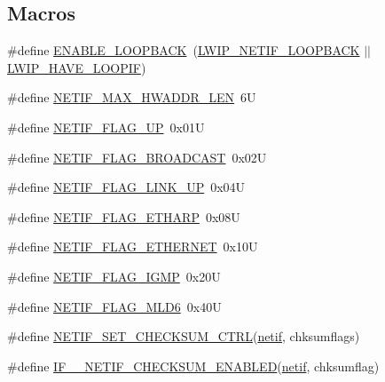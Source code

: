 \subsection*{Macros}
\begin{DoxyCompactItemize}
\item 
\#define \hyperlink{openmote-cc2538_2lwip_2src_2include_2lwip_2netif_8h_a53a4d9ad0bbe679841b5ff3f6906076c}{E\+N\+A\+B\+L\+E\+\_\+\+L\+O\+O\+P\+B\+A\+CK}~(\hyperlink{group__lwip__opts__loop_ga724a0ea765d5a47d026d529725f31c01}{L\+W\+I\+P\+\_\+\+N\+E\+T\+I\+F\+\_\+\+L\+O\+O\+P\+B\+A\+CK} $\vert$$\vert$ \hyperlink{group__lwip__opts__loop_gaa2b1f736373cd896e212644aa453fbaf}{L\+W\+I\+P\+\_\+\+H\+A\+V\+E\+\_\+\+L\+O\+O\+P\+IF})
\item 
\#define \hyperlink{openmote-cc2538_2lwip_2src_2include_2lwip_2netif_8h_ab887a8ec553de1be1d04cf2961c63c41}{N\+E\+T\+I\+F\+\_\+\+M\+A\+X\+\_\+\+H\+W\+A\+D\+D\+R\+\_\+\+L\+EN}~6U
\item 
\#define \hyperlink{group__netif__flags_gab47d7d130693dc155f480a5bf447725e}{N\+E\+T\+I\+F\+\_\+\+F\+L\+A\+G\+\_\+\+UP}~0x01U
\item 
\#define \hyperlink{group__netif__flags_gaef64fe15c82bc7b235366923e517104e}{N\+E\+T\+I\+F\+\_\+\+F\+L\+A\+G\+\_\+\+B\+R\+O\+A\+D\+C\+A\+ST}~0x02U
\item 
\#define \hyperlink{group__netif__flags_ga75f5a2b9276c93e3bd18a568459fd2d8}{N\+E\+T\+I\+F\+\_\+\+F\+L\+A\+G\+\_\+\+L\+I\+N\+K\+\_\+\+UP}~0x04U
\item 
\#define \hyperlink{group__netif__flags_ga92448dc510bc8d700c09e5c971ef0676}{N\+E\+T\+I\+F\+\_\+\+F\+L\+A\+G\+\_\+\+E\+T\+H\+A\+RP}~0x08U
\item 
\#define \hyperlink{group__netif__flags_ga76ad9d0cf9f029df0ab2a998c64040dc}{N\+E\+T\+I\+F\+\_\+\+F\+L\+A\+G\+\_\+\+E\+T\+H\+E\+R\+N\+ET}~0x10U
\item 
\#define \hyperlink{group__netif__flags_gac9493b923d733c73f6006d9714826558}{N\+E\+T\+I\+F\+\_\+\+F\+L\+A\+G\+\_\+\+I\+G\+MP}~0x20U
\item 
\#define \hyperlink{group__netif__flags_gab14fbe1447d2fdbdf5abc87f51eb6508}{N\+E\+T\+I\+F\+\_\+\+F\+L\+A\+G\+\_\+\+M\+L\+D6}~0x40U
\item 
\#define \hyperlink{openmote-cc2538_2lwip_2src_2include_2lwip_2netif_8h_ac0aca2a2d3c7d7095939d818acf4dbd2}{N\+E\+T\+I\+F\+\_\+\+S\+E\+T\+\_\+\+C\+H\+E\+C\+K\+S\+U\+M\+\_\+\+C\+T\+RL}(\hyperlink{structnetif}{netif},  chksumflags)
\item 
\#define \hyperlink{openmote-cc2538_2lwip_2src_2include_2lwip_2netif_8h_ad968df1b35c2fae368e087966e3bc677}{I\+F\+\_\+\+\_\+\+N\+E\+T\+I\+F\+\_\+\+C\+H\+E\+C\+K\+S\+U\+M\+\_\+\+E\+N\+A\+B\+L\+ED}(\hyperlink{structnetif}{netif},  chksumflag)
$$
\end{DoxyCompactItemize}

